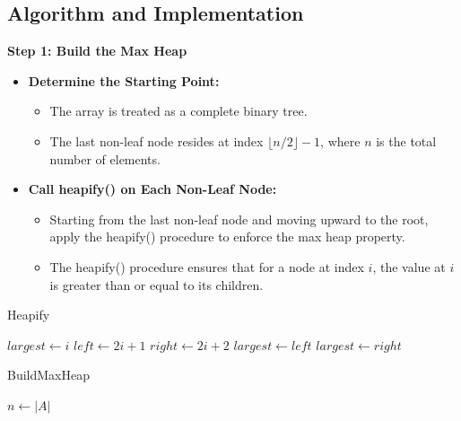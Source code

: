 \subsection{Algorithm and Implementation}

\textbf{Step 1: Build the Max Heap}
\begin{itemize}
    \item \textbf{Determine the Starting Point:}
    \begin{itemize}
        \item The array is treated as a complete binary tree.
        \item The last non-leaf node resides at index $\lfloor n/2 \rfloor - 1$, where $n$ is the total number of elements.
    \end{itemize}
    \item \textbf{Call heapify() on Each Non-Leaf Node:}
    \begin{itemize}
        \item Starting from the last non-leaf node and moving upward to the root, apply the heapify() procedure to enforce the max heap property.
        \item The heapify() procedure ensures that for a node at index $i$, the value at $i$ is greater than or equal to its children.
    \end{itemize}
\end{itemize}

\begin{algorithm}
    \caption{Heapify}
    \begin{algorithmic}[1]
        \State $largest \gets i$
        \State $left \gets 2i + 1$
        \State $right \gets 2i + 2$
        \State $largest \gets left$
        \EndIf
        \State $largest \gets right$
        \EndIf
        \State {}
        \State {}
        \EndIf
        \EndFunction
    \end{algorithmic}
\end{algorithm}

\begin{algorithm}
    \caption{BuildMaxHeap}
    \begin{algorithmic}[1]
        \State $n \gets |A|$
        \State {}
        \EndFor
        \EndFunction
    \end{algorithmic}
\end{algorithm}

